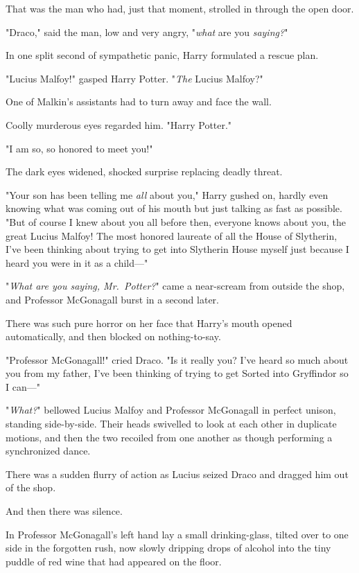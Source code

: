 That was the man who had, just that moment, strolled in through the open door.

"Draco," said the man, low and very angry, "\emph{what} are you \emph{saying?}"

In one split second of sympathetic panic, Harry formulated a rescue plan.

"Lucius Malfoy!" gasped Harry Potter. "\emph{The} Lucius Malfoy?"

One of Malkin's assistants had to turn away and face the wall.

Coolly murderous eyes regarded him. "Harry Potter."

"I am so, so honored to meet you!"

The dark eyes widened, shocked surprise replacing deadly threat.

"Your son has been telling me \emph{all} about you," Harry gushed on, hardly
even knowing what was coming out of his mouth but just talking as fast as
possible. "But of course I knew about you all before then, everyone knows about
you, the great Lucius Malfoy! The most honored laureate of all the House of
Slytherin, I've been thinking about trying to get into Slytherin House myself
just because I heard you were in it as a child—"

"\emph{What are you saying, Mr.~Potter?}" came a near-scream from outside the
shop, and Professor McGonagall burst in a second later.

There was such pure horror on her face that Harry's mouth opened automatically,
and then blocked on nothing-to-say.

"Professor McGonagall!" cried Draco. "Is it really you? I've heard so much
about you from my father, I've been thinking of trying to get Sorted into
Gryffindor so I can—"

"\emph{What?}" bellowed Lucius Malfoy and Professor McGonagall in perfect
unison, standing side-by-side. Their heads swivelled to look at each other in
duplicate motions, and then the two recoiled from one another as though
performing a synchronized dance.

There was a sudden flurry of action as Lucius seized Draco and dragged him out
of the shop.

And then there was silence.

In Professor McGonagall's left hand lay a small drinking-glass, tilted over to
one side in the forgotten rush, now slowly dripping drops of alcohol into the
tiny puddle of red wine that had appeared on the floor.

